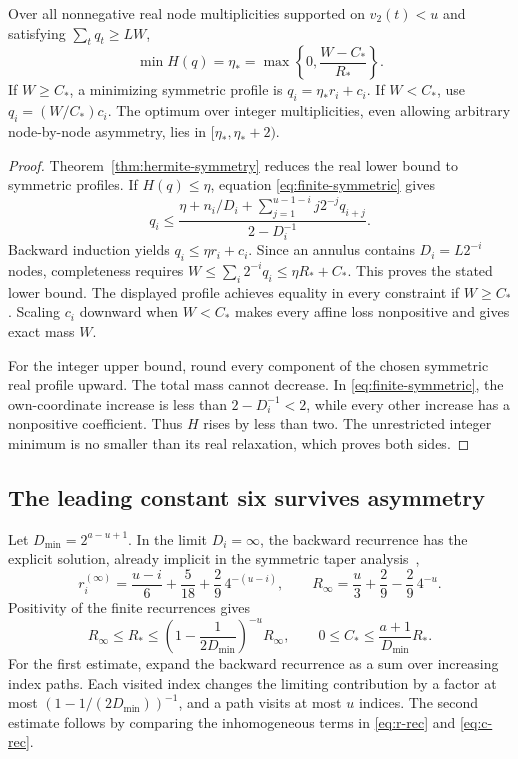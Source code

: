 \begin{theorem}
\label{thm:finite-hermite}
Over all nonnegative real node multiplicities supported on
$v_2(t)<u$ and satisfying $\sum_tq_t\ge LW$,
\[
 \min H(q)=\eta_*=\max\left\{0,\frac{W-C_*}{R_*}\right\}.
\]
If $W\ge C_*$, a minimizing symmetric profile is
$q_i=\eta_*r_i+c_i$. If $W<C_*$, use $q_i=(W/C_*)c_i$.
The optimum over integer multiplicities, even allowing arbitrary
node-by-node asymmetry, lies in $[\eta_*,\eta_*+2)$.
\end{theorem}
\begin{proof}
Theorem~\ref{thm:hermite-symmetry} reduces the real lower bound to
symmetric profiles. If $H(q)\le\eta$, equation
\eqref{eq:finite-symmetric} gives
\[
 q_i\le
 \frac{\eta+n_i/D_i+\sum_{j=1}^{u-1-i}j2^{-j}q_{i+j}}
      {2-D_i^{-1}}.
\]
Backward induction yields $q_i\le\eta r_i+c_i$. Since an annulus
contains $D_i=L2^{-i}$ nodes, completeness requires
$W\le\sum_i2^{-i}q_i\le\eta R_*+C_*$. This proves the stated
lower bound. The displayed profile achieves equality in every
constraint if $W\ge C_*$. Scaling $c_i$ downward when $W<C_*$
makes every affine loss nonpositive and gives exact mass $W$.

For the integer upper bound, round every component of the chosen
symmetric real profile upward. The total mass cannot decrease.
In \eqref{eq:finite-symmetric}, the own-coordinate increase is
less than $2-D_i^{-1}<2$, while every other increase has a
nonpositive coefficient. Thus $H$ rises by less than two.
The unrestricted integer minimum is no smaller than its real
relaxation, which proves both sides.
\end{proof}

\subsection{The leading constant six survives asymmetry}

Let $D_{\min}=2^{a-u+1}$. In the limit $D_i=\infty$, the backward
recurrence has the explicit solution, already implicit in the
symmetric taper analysis~\cite{precision},
\[
 r_i^{(\infty)}
 =\frac{u-i}{6}+\frac5{18}+\frac29\,4^{-(u-i)},\qquad
 R_\infty=\frac u3+\frac29-\frac29\,4^{-u}.
\]
Positivity of the finite recurrences gives
\begin{equation}\label{eq:R-comparison}
 R_\infty\le R_*
 \le\left(1-\frac1{2D_{\min}}\right)^{-u}R_\infty,
 \qquad
 0\le C_*\le\frac{a+1}{D_{\min}}R_*.
\end{equation}
For the first estimate, expand the backward recurrence as a sum over
increasing index paths. Each visited index changes the limiting
contribution by a factor at most
$(1-1/(2D_{\min}))^{-1}$, and a path visits at most $u$ indices.
The second estimate follows by comparing the inhomogeneous terms
in \eqref{eq:r-rec} and \eqref{eq:c-rec}.

